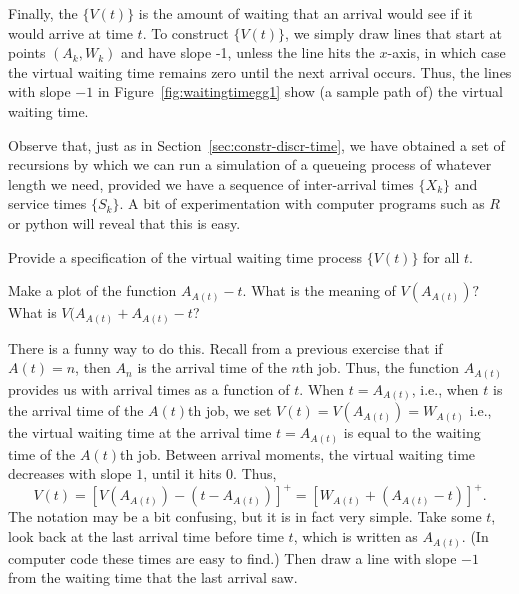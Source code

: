 Finally, the  $\{V(t)\}$ is the
amount of waiting that an arrival would see if it would arrive at time
$t$. To construct $\{V(t)\}$, we simply draw lines that start at
points $(A_k, W_k)$ and have slope -1, unless the line hits the
$x$-axis, in which case the virtual waiting time remains zero until
the next arrival occurs.  Thus, the lines with slope $-1$ in
Figure~\ref{fig:waitingtimegg1} show (a sample path of) the virtual
waiting time.


Observe that, just as in Section~\ref{sec:constr-discr-time}, we have
obtained a set of recursions by which we can run a simulation of a
queueing process of whatever length we need, provided we have a
sequence of inter-arrival times $\{X_k\}$ and service times
$\{S_k\}$.  A bit of experimentation with computer programs such as
$R$ or python will reveal that this is easy.





\begin{exercise}
  Provide a specification of the virtual waiting time process $\{V(t)\}$ for
    all $t$.
    \begin{hint}Make a plot of the function $A_{A(t)}-t$. What is the meaning of $V(A_{A(t)})?$ What is
$V(A_{A(t)} + A_{A(t)}-t$?
    \end{hint}
    \begin{solution}
      There is a funny way to do this. Recall from a previous exercise
      that if $A(t)=n$, then $A_n$ is the arrival time of the $n$th
      job. Thus, the function $A_{A(t)}$ provides us with arrival
      times as a function of $t$. When $t=A_{A(t)}$, i.e., when $t$ is
      the arrival time of the $A(t)$th job, we set
      $V(t) = V(A_{A(t)}) = W_{A(t)}$ i.e., the virtual waiting time
      at the arrival time $t=A_{A(t)}$ is equal to the waiting time of
      the $A(t)$th job. Between arrival moments, the virtual waiting
      time decreases with slope $1$, until it hits 0.  Thus,
      \begin{equation*}
        V(t) 
= [V(A_{A(t)}) - (t-A_{A(t)})]^+= [W_{A(t)} + (A_{A(t)}-t)]^+.
      \end{equation*}
      The notation may be a bit confusing, but it is in fact very
      simple. Take some $t$, look back at the last arrival time before
      time $t$, which is written as $A_{A(t)}$. (In computer code these
      times are easy to find.) Then draw a line with slope $-1$ from
      the waiting time that the last arrival saw.
    \end{solution}
\end{exercise}




